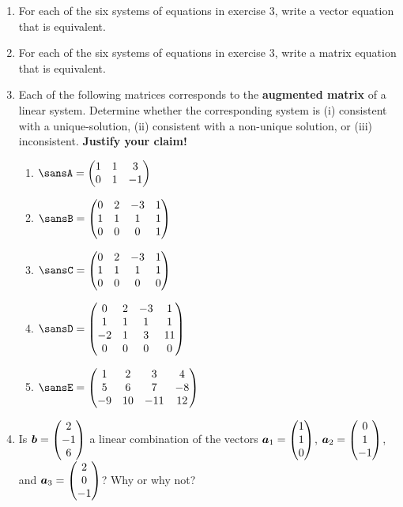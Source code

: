 \documentclass[12 pt]{article}
\newcommand{\pmat}[1]{\begin{pmatrix}#1\end{pmatrix}}
\begin{document}
\begin{enumerate}[leftmargin=0in, rightmargin=-0.25in]
	\newpage
	
	\item For each of the six systems of equations in exercise 3, write a vector equation that is equivalent.\vspace{1in}
	
	\item For each of the six systems of equations in exercise 3, write a matrix equation that is equivalent.\vspace{1in}

	\item Each of the following matrices corresponds to the \textbf{augmented matrix} of a linear system. Determine whether the corresponding system is (i) consistent with a unique-solution, (ii) consistent with a non-unique solution, or (iii) inconsistent. \textbf{Justify your claim!}
	\begin{adjustwidth}{0in}{-0.375in}
		\begin{multicols}{2}
			\begin{enumerate}[itemsep=1in]
				\item $\sansA=\pmat{1 & 1 & 3 \\ 0 & 1 & -1}$
				\item $\sansB=\pmat{0 & 2 & -3 & 1 \\ 1 & 1 & 1 & 1 \\ 0 & 0 & 0 & 1}$
				\item $\sansC=\pmat{0 & 2 & -3 & 1 \\ 1 & 1 & 1 & 1 \\ 0 & 0 & 0 & 0}$
				\item $\sansD=\pmat{0 & 2 & -3 & 1 \\ 1 & 1 & 1 & 1 \\ -2 & 1 & 3 & 11 \\ 0 & 0 & 0 & 0}$\vspace{0.5in}
				\item $\sansE=\pmat{1 & 2 & 3 & 4 \\ 5 & 6 & 7 & -8 \\ -9 & 10 & -11 & 12}$
			\end{enumerate}
		\end{multicols}
	\end{adjustwidth}

	\newpage
	
	\item Is $\vect{b}=\pmat{2 \\ -1 \\ 6}$ a linear combination of the vectors $\vect{a}_1=\pmat{1 \\ 1 \\ 0}$, $\vect{a}_2=\pmat{0 \\ 1 \\ -1}$, and $\vect{a}_3=\pmat{2 \\ 0 \\ -1}$? Why or why not?\vspace{0.375in}
	

\end{enumerate}
\end{document}
